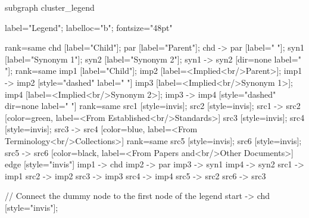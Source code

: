 \documentclass{article}
\begin{document}
{subgraph cluster_legend {

    label="Legend";
    labelloc="b";
    fontsize="48pt"

    {
        rank=same
        chd [label="Child"];
        par [label="Parent"];
        chd -> par [label="                "];
        syn1 [label="Synonym 1"];
        syn2 [label="Synonym 2"];
        syn1 -> syn2 [dir=none label="                "];
    }
    {
        rank=same
        imp1 [label="Child"];
        imp2 [label=<Implied<br/>Parent>];
        imp1 -> imp2 [style="dashed" label="                "]
        imp3 [label=<Implied<br/>Synonym 1>];
        imp4 [label=<Implied<br/>Synonym 2>];
        imp3 -> imp4 [style="dashed" dir=none label="                "]
    }
{
rank=same
src1 [style=invis];
src2 [style=invis];
src1 -> src2 [color=green, label=<From Established<br/>Standards>]
src3 [style=invis];
src4 [style=invis];
src3 -> src4 [color=blue, label=<From Terminology<br/>Collections>]
}
{
rank=same
src5 [style=invis];
src6 [style=invis];
src5 -> src6 [color=black, label=<From Papers and<br/>Other Documents>]
}
edge [style="invis"]
imp1 -> chd
imp2 -> par
imp3 -> syn1
imp4 -> syn2
src1 -> imp1
src2 -> imp2
src3 -> imp3
src4 -> imp4
src5 -> src2
src6 -> src3
}

// Connect the dummy node to the first node of the legend
start -> chd [style="invis"];
}
\end{document}
